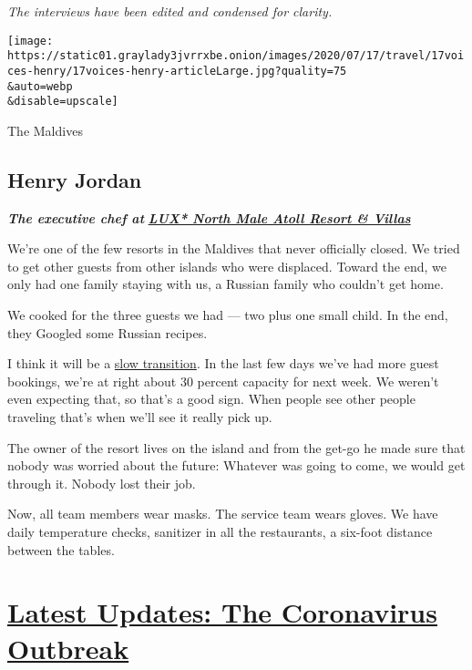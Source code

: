 \emph{The interviews have been edited and condensed for clarity.}

\texttt{[image: https://static01.graylady3jvrrxbe.onion/images/2020/07/17/travel/17voices-henry/17voices-henry-articleLarge.jpg?quality=75\\\&auto=webp\\\&disable=upscale]}

The Maldives

\hypertarget{henry-jordan}{%
\subsection{Henry Jordan}\label{henry-jordan}}

\emph{\textbf{The executive chef at}}
\textbf{\href{https://www.luxresorts.com/en/maldives/hotel/luxnorthmaleatoll}{\emph{LUX*
North Male Atoll Resort \& Villas}}}

We're one of the few resorts in the Maldives that never officially
closed. We tried to get other guests from other islands who were
displaced. Toward the end, we only had one family staying with us, a
Russian family who couldn't get home.

We cooked for the three guests we had --- two plus one small child. In
the end, they Googled some Russian recipes.

I think it will be a
\href{http://www.tourism.gov.mv/en/news/maldives_welcomes_back_first_tourists}{slow
transition}. In the last few days we've had more guest bookings, we're
at right about 30 percent capacity for next week. We weren't even
expecting that, so that's a good sign. When people see other people
traveling that's when we'll see it really pick up.

The owner of the resort lives on the island and from the get-go he made
sure that nobody was worried about the future: Whatever was going to
come, we would get through it. Nobody lost their job.

Now, all team members wear masks. The service team wears gloves. We have
daily temperature checks, sanitizer in all the restaurants, a six-foot
distance between the tables.

\hypertarget{latest-updates-the-coronavirus-outbreak}{%
\section{\texorpdfstring{\href{https://www.nytimes3xbfgragh.onion/2020/08/21/world/covid-19-coronavirus.html?action=click\&pgtype=Article\&state=default\&region=MAIN_CONTENT_1\&context=storylines_live_updates}{Latest
Updates: The Coronavirus
Outbreak}}{Latest Updates: The Coronavirus Outbreak}}\label{latest-updates-the-coronavirus-outbreak}}

